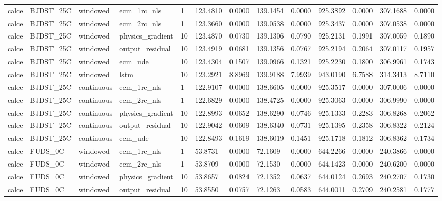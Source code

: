 \begin{tabular}{lllllllllllll}
calce & BJDST\_25C & windowed & ecm\_1rc\_nls & 1 & 123.4810 & 0.0000 & 139.1454 & 0.0000 & 925.3892 & 0.0000 & 307.1688 & 0.0000 \\
calce & BJDST\_25C & windowed & ecm\_2rc\_nls & 1 & 123.3660 & 0.0000 & 139.0538 & 0.0000 & 925.3437 & 0.0000 & 307.0538 & 0.0000 \\
calce & BJDST\_25C & windowed & physics\_gradient & 10 & 123.4870 & 0.0730 & 139.1306 & 0.0790 & 925.2131 & 0.1991 & 307.0059 & 0.1890 \\
calce & BJDST\_25C & windowed & output\_residual & 10 & 123.4919 & 0.0681 & 139.1356 & 0.0767 & 925.2194 & 0.2064 & 307.0117 & 0.1957 \\
calce & BJDST\_25C & windowed & ecm\_ude & 10 & 123.4304 & 0.1507 & 139.0966 & 0.1321 & 925.2230 & 0.1800 & 306.9961 & 0.1743 \\
calce & BJDST\_25C & windowed & lstm & 10 & 123.2921 & 8.8969 & 139.9188 & 7.9939 & 943.0190 & 6.7588 & 314.3413 & 8.7110 \\
calce & BJDST\_25C & continuous & ecm\_1rc\_nls & 1 & 122.9107 & 0.0000 & 138.6605 & 0.0000 & 925.3517 & 0.0000 & 307.0006 & 0.0000 \\
calce & BJDST\_25C & continuous & ecm\_2rc\_nls & 1 & 122.6829 & 0.0000 & 138.4725 & 0.0000 & 925.3063 & 0.0000 & 306.9990 & 0.0000 \\
calce & BJDST\_25C & continuous & physics\_gradient & 10 & 122.8993 & 0.0652 & 138.6290 & 0.0746 & 925.1333 & 0.2283 & 306.8268 & 0.2062 \\
calce & BJDST\_25C & continuous & output\_residual & 10 & 122.9042 & 0.0609 & 138.6340 & 0.0731 & 925.1395 & 0.2358 & 306.8322 & 0.2124 \\
calce & BJDST\_25C & continuous & ecm\_ude & 10 & 122.8493 & 0.1619 & 138.6019 & 0.1451 & 925.1718 & 0.1812 & 306.8362 & 0.1734 \\
calce & FUDS\_0C & windowed & ecm\_1rc\_nls & 1 & 53.8731 & 0.0000 & 72.1609 & 0.0000 & 644.2266 & 0.0000 & 240.3866 & 0.0000 \\
calce & FUDS\_0C & windowed & ecm\_2rc\_nls & 1 & 53.8709 & 0.0000 & 72.1530 & 0.0000 & 644.1423 & 0.0000 & 240.6200 & 0.0000 \\
calce & FUDS\_0C & windowed & physics\_gradient & 10 & 53.8657 & 0.0824 & 72.1352 & 0.0637 & 644.0124 & 0.2693 & 240.2707 & 0.1730 \\
calce & FUDS\_0C & windowed & output\_residual & 10 & 53.8550 & 0.0757 & 72.1263 & 0.0583 & 644.0011 & 0.2709 & 240.2581 & 0.1777 \\

\end{tabular}

